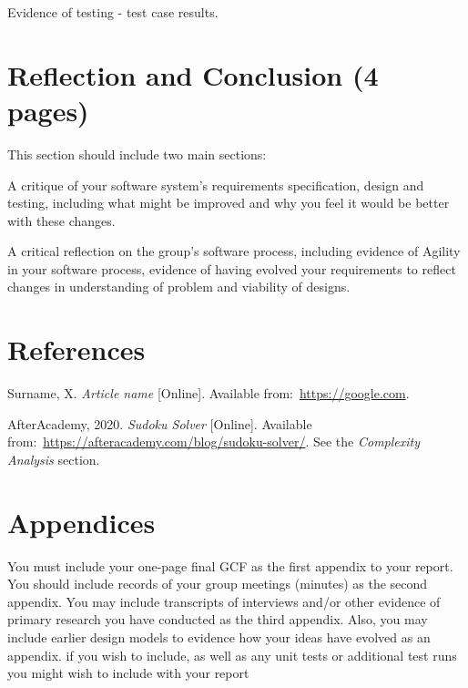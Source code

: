 \documentclass[12pt]{article}
\begin{document}
Evidence of testing - test case results.


\section{Reflection and Conclusion (4 pages)}

This section should include two main sections:

A critique of your software system’s requirements specification, design and testing,
including what might be improved and why you feel it would be better with these
changes.

A critical reflection on the group’s software process, including evidence of Agility in
your software process, evidence of having evolved your requirements to reflect
changes in understanding of problem and viability of designs.


\section{References}

\renewcommand{\refname}{} 
\vspace{-20pt}
\begin{thebibliography}{99}
     Surname, X. \textit{Article name} [Online].
    Available from:~\url{https://google.com}.

     AfterAcademy, 2020. \textit{Sudoku Solver} [Online].
    Available from:~\url{https://afteracademy.com/blog/sudoku-solver/}. See the
    \textit{Complexity Analysis} section.
\end{thebibliography}


\section{Appendices}
You must include your one-page final GCF as the first appendix to your report. You should
include records of your group meetings (minutes) as the second appendix. You may include
transcripts of interviews and/or other evidence of primary research you have conducted as
the third appendix.
Also, you may include earlier design models to evidence how your ideas have evolved as an
appendix. if you wish to include, as well as any unit tests or additional test runs you might
wish to include with your report
\end{document}
